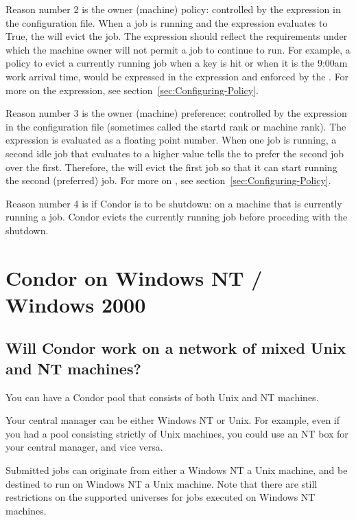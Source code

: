 Reason number 2 is the owner (machine) policy:
controlled by the  expression in the configuration file.
When a job is running and the  expression
evaluates to True,
the  will evict the job.
The  expression should reflect 
the requirements under which the machine owner will not permit
a job to continue to run.
For example, a policy to evict a currently running job when a key is hit
or when it is the 9:00am work arrival time,
would be expressed in the  expression 
and enforced by the .
For more on the  expression,
see section~\ref{sec:Configuring-Policy}.

Reason number 3 is the owner (machine) preference:
controlled by the  expression in the 
configuration file (sometimes called the startd rank or machine rank).
The  expression is evaluated as a floating point number.
When one job is running, a second idle job that evaluates to a higher
 value 
tells the  to prefer the second job over the first.
Therefore, the  will evict the first 
job so that it can start running the second (preferred) job.
For more on ,
see section~\ref{sec:Configuring-Policy}.

Reason number 4 is if Condor is to be shutdown:
on a machine that is currently running a job.
Condor evicts the currently running job before proceding
with the shutdown.

\section{Condor on Windows NT / Windows 2000}

\subsection{Will Condor work on a network of mixed Unix and NT machines?}

You can have a Condor pool that consists of both Unix and NT machines.

Your central manager can be either Windows NT or Unix.  For example,
even if you had a pool consisting strictly of Unix machines, you could
use an NT box for your central manager, and vice versa.

Submitted jobs can originate from either a 
Windows NT  a Unix machine,
and be destined to run on Windows NT 
 a Unix machine.
Note that there are still restrictions on the supported universes
for jobs executed on Windows NT machines.

